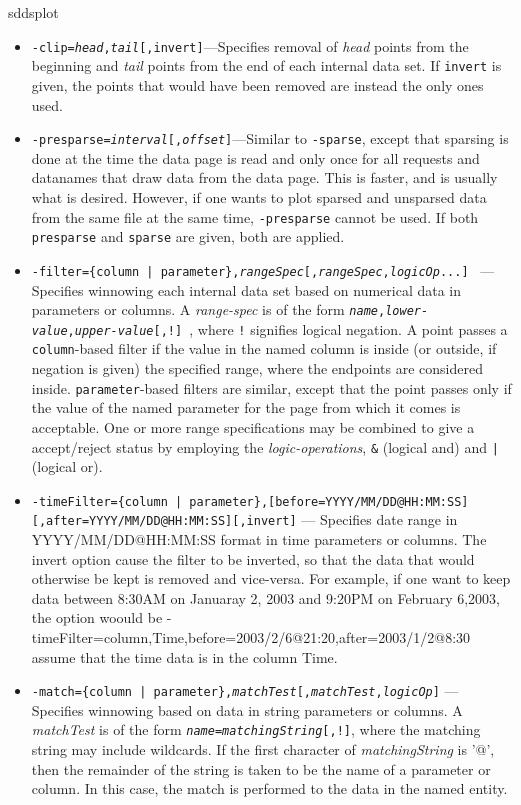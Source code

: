 \begin{sddsprog}{sddsplot}
\begin{itemize}
\begin{itemize}
  \item {\tt -clip={\em head},{\em tail}[,invert]}---Specifies removal of {\em head} points from the
beginning and {\em tail} points from the end of each internal data set.  If {\tt invert} is given,
the points that would have been removed are instead the only ones used.

  \item {\tt -presparse={\em interval}[,{\em offset}]}---Similar to {\tt -sparse}, except that
sparsing is done at the time the data page is read and only once for all requests and
datanames that draw data from the data page.  This is faster, and is usually what is desired.
However, if one wants to plot sparsed and unsparsed data from the same file at the same time,
{\tt -presparse} cannot be used.  If both {\tt presparse} and {\tt sparse} are given, both
are applied.

   \item {\tt -filter=\{column | parameter\},{\em rangeSpec}[,{\em rangeSpec},{\em logicOp}...] }
--- Specifies winnowing each internal data set based on numerical data in parameters or columns.  A
{\em range-spec} is of the form {\tt {\em name},{\em lower-value},{\em upper-value}[,!] }, where
\verb|!| signifies logical negation.  A point passes a {\tt column}-based filter if the value in the
named column is inside (or outside, if negation is given) the specified range, where the endpoints
are considered inside.  {\tt parameter}-based filters are similar, except that the point passes only
if the value of the named parameter for the page from which it comes is acceptable.  One or more
range specifications may be combined to give a accept/reject status by employing the {\em
logic-operations}, \verb|&| (logical and) and \verb&|& (logical or).
     \item {\tt -timeFilter=\{column | parameter\},[before=YYYY/MM/DD@HH:MM:SS] [,after=YYYY/MM/DD@HH:MM:SS][,invert]} 
--- Specifies date range in YYYY/MM/DD@HH:MM:SS format in time parameters or columns. The invert option cause the
filter to be inverted, so that the data that would otherwise be kept is removed and vice-versa. For example,
if one want to keep data between 8:30AM on Januaray 2, 2003 and 9:20PM on February 6,2003, the option woould be
     -timeFilter=column,Time,before=2003/2/6@21:20,after=2003/1/2@8:30
assume that the time data is in the column Time.
   \item {\tt -match=\{column | parameter\},{\em matchTest}[,{\em matchTest},{\em logicOp}]} ---
Specifies winnowing based on data in string parameters or columns.  A {\em matchTest} is of the form
{\tt {\em name}={\em matchingString}[,!]}, where the matching string may include wildcards.
If the first character of {\em matchingString} is '@', then the remainder of the string is taken to
be the name of a parameter or column.  In this case, the match is performed to the data in the named
entity.


\end{itemize}
\end{itemize}
\end{sddsprog}
